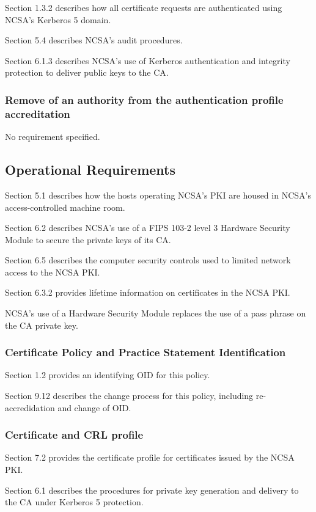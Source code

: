 \documentclass[10pt]{article}
\begin{document}
Section 1.3.2 describes how all certificate requests are authenticated
using NCSA's Kerberos 5 domain.

Section 5.4 describes NCSA's audit procedures.

Section 6.1.3 describes NCSA's use of Kerberos authentication and
integrity protection to deliver public keys to the CA.

\subsubsection{Remove of an authority from the authentication profile accreditation}

No requirement specified.

\subsection{Operational Requirements}

Section 5.1 describes how the hosts operating NCSA's PKI are housed in
NCSA's access-controlled machine room.

Section 6.2 describes NCSA's use of a FIPS 103-2 level 3 Hardware
Security Module to secure the private keys of its CA.

Section 6.5 describes the computer security controls used to limited
network access to the NCSA PKI.

Section 6.3.2 provides lifetime information on certificates in the
NCSA PKI.

NCSA's use of a Hardware Security Module replaces the use of a pass
phrase on the CA private key.

\subsubsection{Certificate Policy and Practice Statement Identification}

Section 1.2 provides an identifying OID for this policy.

Section 9.12 describes the change process for this policy, including
re-accredidation and change of OID.

\subsubsection{Certificate and CRL profile}

Section 7.2 provides the certificate profile for certificates issued
by the NCSA PKI.

Section 6.1 describes the procedures for private key generation and
delivery to the CA under Kerberos 5 protection. 
\end{document}
